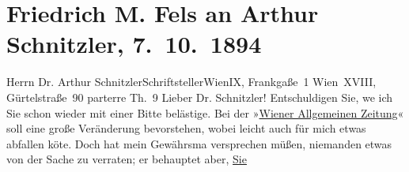 

         
         \renewcommand{\erwaehntePersonen}{Personen: Friedrich Michael Fels, Julius von Gans-Ludassy}
         \renewcommand{\erwaehnteInstitutionen}{Institutionen: Wiener Allgemeine Zeitung}
         \renewcommand{\erwaehnteOrte}{Orte: Frankgasse 1, IX., Alsergrund, Wien, Währinger Gürtel, XVIII., Währing}
         \renewcommand{\erwaehnteWerke}{}
               \section[Friedrich M. Fels an Arthur Schnitzler, 7. 10. 1894]{ Friedrich M. Fels an Arthur Schnitzler, 7. 10. 1894}\nopagebreak{}\rehead{ }\begin{ledgroupsized}[t]{13cm}\normalsize\beginnumbering{} \toendnotes[C]{\smallbreak\pagebreak[2]} 
\toendnotes[C]{\smallbreak}\pstart{}{\pb}Herrn Dr. Arthur Schnitzler\pend{}\pstart{}Schriftsteller\pend{}\pstart{}Wien\pend{}\pstart{}IX, Frankgaße 1\pend{}{\bigskip}\pstart
           \noindent{}\raggedleft{}{\pb}Wien XVIII, Gürtelstraße 90 parterre Th. 9 \pend
           \pstart{}Lieber Dr. Schnitzler!\pend\pstart
           Entschuldigen Sie, we{\geminationn} ich Sie schon wieder mit einer
               Bitte belästige. Bei der »\uline{Wiener Allgemeinen Zeitung}« soll eine große Veränderung bevorstehen, wobei leicht auch für mich etwas abfallen kö{\geminationn}te. Doch
               hat mein Gewährsma{\geminationn} versprechen müßen, niemanden etwas
               von der Sache zu verraten; er behauptet aber, \uline{Sie}

\end{ledgroupsized}
